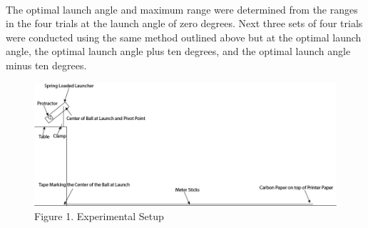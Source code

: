 \documentclass[12pt]{article}
\begin{document}
        \paragraph{}The optimal launch angle and maximum range were determined from the ranges in the four trials at 
        the launch angle of zero degrees. Next three sets of four trials were conducted using the same method outlined 
        above but at the optimal launch angle, the optimal launch angle plus ten degrees, and the optimal launch angle 
        minus ten degrees. \\
        \begin{figure}[h]
            \caption{Figure 1. Experimental Setup}
            \includegraphics[width=\linewidth]{Setup.png}
        \end{figure}
\end{document}
